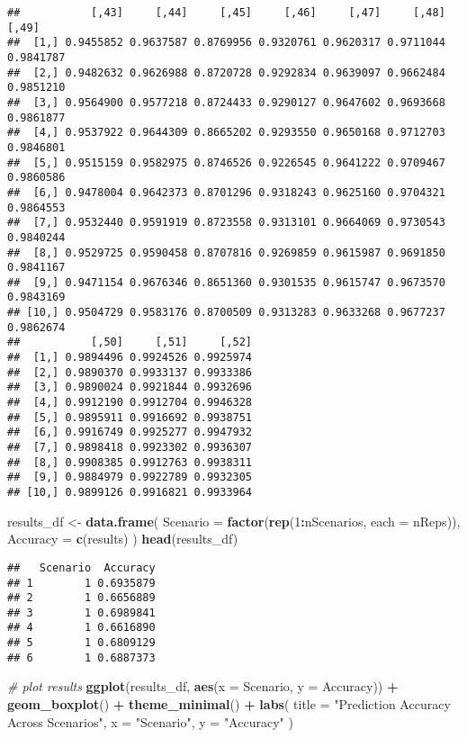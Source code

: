 \documentclass[
]{article}
\newenvironment{Shaded}{\begin{snugshade}}{\end{snugshade}}
\newcommand{\AttributeTok}[1]{\textcolor[rgb]{0.13,0.29,0.53}{#1}}
\newcommand{\CommentTok}[1]{\textcolor[rgb]{0.56,0.35,0.01}{\textit{#1}}}
\newcommand{\DecValTok}[1]{\textcolor[rgb]{0.00,0.00,0.81}{#1}}
\newcommand{\FunctionTok}[1]{\textcolor[rgb]{0.13,0.29,0.53}{\textbf{#1}}}
\newcommand{\NormalTok}[1]{#1}
\newcommand{\OtherTok}[1]{\textcolor[rgb]{0.56,0.35,0.01}{#1}}
\newcommand{\SpecialCharTok}[1]{\textcolor[rgb]{0.81,0.36,0.00}{\textbf{#1}}}
\newcommand{\StringTok}[1]{\textcolor[rgb]{0.31,0.60,0.02}{#1}}
\begin{document}
\begin{verbatim}
##           [,43]     [,44]     [,45]     [,46]     [,47]     [,48]     [,49]
##  [1,] 0.9455852 0.9637587 0.8769956 0.9320761 0.9620317 0.9711044 0.9841787
##  [2,] 0.9482632 0.9626988 0.8720728 0.9292834 0.9639097 0.9662484 0.9851210
##  [3,] 0.9564900 0.9577218 0.8724433 0.9290127 0.9647602 0.9693668 0.9861877
##  [4,] 0.9537922 0.9644309 0.8665202 0.9293550 0.9650168 0.9712703 0.9846801
##  [5,] 0.9515159 0.9582975 0.8746526 0.9226545 0.9641222 0.9709467 0.9860586
##  [6,] 0.9478004 0.9642373 0.8701296 0.9318243 0.9625160 0.9704321 0.9864553
##  [7,] 0.9532440 0.9591919 0.8723558 0.9313101 0.9664069 0.9730543 0.9840244
##  [8,] 0.9529725 0.9590458 0.8707816 0.9269859 0.9615987 0.9691850 0.9841167
##  [9,] 0.9471154 0.9676346 0.8651360 0.9301535 0.9615747 0.9673570 0.9843169
## [10,] 0.9504729 0.9583176 0.8700509 0.9313283 0.9633268 0.9677237 0.9862674
##           [,50]     [,51]     [,52]
##  [1,] 0.9894496 0.9924526 0.9925974
##  [2,] 0.9890370 0.9933137 0.9933386
##  [3,] 0.9890024 0.9921844 0.9932696
##  [4,] 0.9912190 0.9912704 0.9946328
##  [5,] 0.9895911 0.9916692 0.9938751
##  [6,] 0.9916749 0.9925277 0.9947932
##  [7,] 0.9898418 0.9923302 0.9936307
##  [8,] 0.9908385 0.9912763 0.9938311
##  [9,] 0.9884979 0.9922789 0.9932305
## [10,] 0.9899126 0.9916821 0.9933964
\end{verbatim}

\begin{Shaded}
\begin{Highlighting}[]
\NormalTok{results\_df }\OtherTok{\textless{}{-}} \FunctionTok{data.frame}\NormalTok{(}
  \AttributeTok{Scenario =} \FunctionTok{factor}\NormalTok{(}\FunctionTok{rep}\NormalTok{(}\DecValTok{1}\SpecialCharTok{:}\NormalTok{nScenarios, }\AttributeTok{each =}\NormalTok{ nReps)),}
  \AttributeTok{Accuracy =} \FunctionTok{c}\NormalTok{(results)}
\NormalTok{)}
\FunctionTok{head}\NormalTok{(results\_df)}
\end{Highlighting}
\end{Shaded}

\begin{verbatim}
##   Scenario  Accuracy
## 1        1 0.6935879
## 2        1 0.6656889
## 3        1 0.6989841
## 4        1 0.6616890
## 5        1 0.6809129
## 6        1 0.6887373
\end{verbatim}

\begin{Shaded}
\begin{Highlighting}[]
\CommentTok{\# plot results}
\FunctionTok{ggplot}\NormalTok{(results\_df, }\FunctionTok{aes}\NormalTok{(}\AttributeTok{x =}\NormalTok{ Scenario, }\AttributeTok{y =}\NormalTok{ Accuracy)) }\SpecialCharTok{+} 
  \FunctionTok{geom\_boxplot}\NormalTok{() }\SpecialCharTok{+} 
  \FunctionTok{theme\_minimal}\NormalTok{() }\SpecialCharTok{+} 
  \FunctionTok{labs}\NormalTok{(}
    \AttributeTok{title =} \StringTok{"Prediction Accuracy Across Scenarios"}\NormalTok{,}
    \AttributeTok{x =} \StringTok{"Scenario"}\NormalTok{,}
    \AttributeTok{y =} \StringTok{"Accuracy"}
\NormalTok{  )}
\end{Highlighting}
\end{Shaded}
\end{document}
